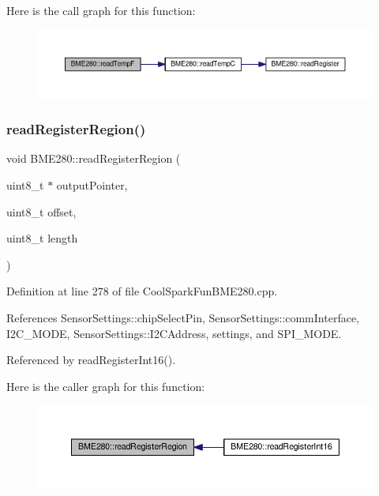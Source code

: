 Here is the call graph for this function\+:
\nopagebreak
\begin{figure}[H]
\begin{center}
\leavevmode
\includegraphics[width=350pt]{df/dcf/class_b_m_e280_a9648b496f6b4700550782a715a98b3c7_cgraph}
\end{center}
\end{figure}
\mbox{\label{class_b_m_e280_aecca87c2c40a7f2bcabcea921bdc6124}} 
\subsubsection{\texorpdfstring{read\+Register\+Region()}{readRegisterRegion()}}
{\footnotesize\ttfamily void B\+M\+E280\+::read\+Register\+Region (\begin{DoxyParamCaption}\item[{uint8\+\_\+t $\ast$}]{output\+Pointer,  }\item[{uint8\+\_\+t}]{offset,  }\item[{uint8\+\_\+t}]{length }\end{DoxyParamCaption})}



Definition at line 278 of file Cool\+Spark\+Fun\+B\+M\+E280.\+cpp.



References Sensor\+Settings\+::chip\+Select\+Pin, Sensor\+Settings\+::comm\+Interface, I2\+C\+\_\+\+M\+O\+DE, Sensor\+Settings\+::\+I2\+C\+Address, settings, and S\+P\+I\+\_\+\+M\+O\+DE.



Referenced by read\+Register\+Int16().

Here is the caller graph for this function\+:
\nopagebreak
\begin{figure}[H]
\begin{center}
\leavevmode
\includegraphics[width=350pt]{df/dcf/class_b_m_e280_aecca87c2c40a7f2bcabcea921bdc6124_icgraph}
\end{center}
\end{figure}
\mbox{\label{class_b_m_e280_a1bbd14c8591966df531e40085342ff71}} 
